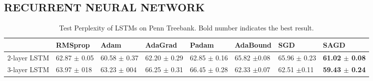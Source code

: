 \documentclass[11pt]{article}
\begin{document}
\vspace{-0.05in}
\subsection{RECURRENT NEURAL NETWORK}\label{subsec: rnn}


\begin{table}[t]
\small
\caption{ Test Perplexity of LSTMs on Penn Treebank. Bold number indicates the best result.}\label{tab:ppl}
\begin{tabular}{llllllll}
\toprule[1pt]
 & RMSprop      & Adam         & AdaGrad      & Padam        & AdaBound    & SGD          & SAGD         \\ \hline
2-layer LSTM & 62.87 $\pm$ 0.05 & 60.58 $\pm$ 0.37 & 62.20 $\pm$ 0.29 & 62.85 $\pm$ 0.16 & 65.82 $\pm$0.08 & 65.96 $\pm$ 0.23 & \textbf{61.02 $\pm$ 0.08} \\
3-layer LSTM & 63.97 $\pm$ 018  & 63.23 $\pm$ 004  & 66.25 $\pm$ 0.31 & 66.45 $\pm$ 0.28 & 62.33 $\pm$0.07 & 62.51 $\pm$0.11  & \textbf{59.43 $\pm$ 0.24} \\
\toprule[1pt]
\end{tabular}
\end{table}
\end{document}
